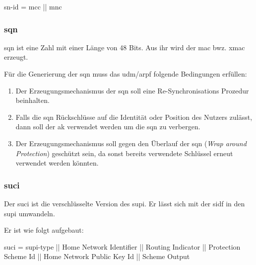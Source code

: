 \gls{sn-id} = \gls{mcc} || \gls{mnc}

\subsubsection{\gls{sqn}}
\gls{sqn} ist eine Zahl mit einer Länge von 48 Bits. %
Aus ihr wird der \gls{mac} bwz. \gls{xmac} erzeugt. %

Für die Generierung der \gls{sqn} muss das \gls{udm}/\gls{arpf} folgende Bedingungen erfüllen:\\%
\begin{enumerate}
\item Der Erzeugungsmechanismus der \gls{sqn} soll eine Re-Synchronisations Prozedur beinhalten.\\
\item Falls die \gls{sqn} Rückschlüsse auf die Identität oder Position des Nutzers zulässt, dann soll der \gls{ak} verwendet werden um die \gls{sqn} zu verbergen.\\
\item Der Erzeugungsmechanismus soll gegen den Überlauf der \gls{sqn} (\textit{Wrap around Protection}) geschützt sein, da sonst bereits verwendete Schlüssel erneut verwendet werden könnten. 
\end{enumerate}

\subsubsection{\gls{suci}}
Der \gls{suci} ist die verschlüsselte Version des \gls{supi}.
Er lässt sich mit der \gls{sidf} in den \gls{supi} umwandeln.

Er ist wie folgt aufgebaut: %

\gls{suci} = \gls{supi-type} || Home Network Identifier || Routing Indicator || Protection Scheme Id || Home Network Public Key Id || Scheme Output

